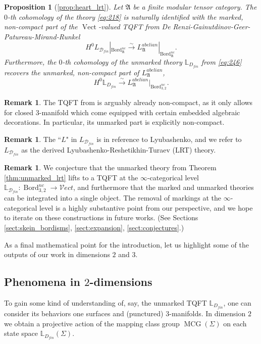 \documentclass[reqno]{amsart}
\newtheorem*{propositionA}{Proposition}
\theoremstyle{definition}
\newtheorem{remark}[lemma]{Remark}
\newcommand{\mfk}[1]{\mathfrak{#1}}
\newcommand{\mbb}[1]{\mathbb{#1}}
\newcommand{\msc}[1]{\mathscr{#1}}
\newcommand{\opn}[1]{\operatorname{#1}}
\newcommand{\Vect}{\msc{V}\!ect}
\DeclareMathOperator{\Bord}{Bord}
\renewcommand{\1}{\mathbf{1}}
\begin{document}
\begin{propositionA}[\ref{prop:heart_lrt}]
Let $\mfk{A}$ be a finite modular tensor category.  The $0$-th cohomology of the theory \eqref{eq:218} is naturally identified with the marked, non-compact part of the $\opn{Vect}$-valued TQFT from De Renzi-Gainutdinov-Geer-Patureau-Mirand-Runkel
\[
H^0L_{\msc{D}_{fin}}|_{\Bord_{\mfk{A}}^{nc}}\overset{\sim}\to L_\mfk{A}^{abelian}|_{\Bord_{\mfk{A}}^{nc}}.
\]
Furthermore, the $0$-th cohomology of the unmarked theory $\mbb{L}_{D_{fin}}$ from \eqref{eq:246} recovers the unmarked, non-compact part of $L_\mfk{A}^{abelian}$,
\[
H^0\mbb{L}_{D_{fin}}\overset{\sim}\to L_{\mfk{A}}^{abelian}|_{\Bord_{3,2}^{nc}}.
\] 
\end{propositionA}

\begin{remark}
The TQFT from \cite{derenzietal23} is arguably already non-compact, as it only allows for closed $3$-manifold which come equipped with certain embedded algebraic decorations.  In particular, its unmarked part is explicitly non-compact.
\end{remark}

\begin{remark}
The ``$L$" in $L_{\msc{D}_{fin}}$ is in reference to Lyubashenko, and we refer to $L_{\msc{D}_{fin}}$ as the derived Lyubashenko-Reshetikhin-Turaev (LRT) theory.
\end{remark}

\begin{remark}
We conjecture that the unmarked theory from Theorem \ref{thm:unmarked_lrt} lifts to a TQFT at the $\infty$-categorical level $\mbb{L}_{\msc{D}_{fin}}:\Bord^{nc}_{3,2}\to \Vect$, and furthermore that the marked and unmarked theories can be integrated into a single object. The removal of markings at the $\infty$-categorical level is a highly substantive point from our perspective, and we hope to iterate on these constructions in future works. (See Sections \ref{sect:skein_bordisms}, \ref{sect:expansion}, \ref{sect:conjectures}.)
\end{remark}

As a final mathematical point for the introduction, let us highlight some of the outputs of our work in dimensions $2$ and $3$.

\subsection{Phenomena in $2$-dimensions}

To gain some kind of understanding of, say, the unmarked TQFT $\mbb{L}_{D_{fin}}$, one can consider its behaviors one surfaces and (punctured) $3$-manifolds.  In dimension $2$ we obtain a projective action of the mapping class group $\opn{MCG}(\Sigma)$ on each state space $\mbb{L}_{D_{fin}}(\Sigma)$.
\par
\end{document}
